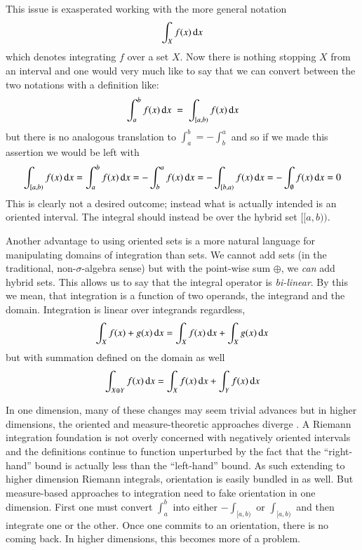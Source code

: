 This issue is exasperated working with the more general notation
\begin{equation*}
	\int_X f(x) \mathop{}\!\mathrm{d} x
\end{equation*}
which denotes integrating $f$ over a set $X$.
Now there is nothing stopping $X$ from an interval and one would very much like to say that we can convert between the
two notations with a definition like:
\begin{equation*}
	\int_a^b f(x) \mathop{}\!\mathrm{d} x \;=\; \int_{[a,b)} f(x) \mathop{}\!\mathrm{d} x
\end{equation*}
but there is no analogous translation to $\int_a^b = - \int_b^a$ and so if we made this assertion we would be left with
\begin{equation*}
	\int_{[a,b)} f(x) \mathop{}\!\mathrm{d} x 
		= \int_a^b f(x) \mathop{}\!\mathrm{d} x 
		= -\int_b^a f(x) \mathop{}\!\mathrm{d} x 
		= - \int_{[b,a)} f(x)\mathop{}\!\mathrm{d} x 
		= -\int_\emptyset f(x)\mathop{}\!\mathrm{d} x 	
		= 0
\end{equation*}
This is clearly not a desired outcome; instead what is actually intended is an oriented interval.
The integral should instead be over the hybrid set $[\![a,b)\!)$.



Another advantage to using oriented sets is a more natural language for manipulating domains of integration than sets.
We cannot add sets (in the traditional, non-$\sigma$-algebra sense) 
but with the point-wise sum $\oplus$, we \emph{can} add hybrid sets.
This allows us to say that the integral operator is \emph{bi-linear}.
By this we mean, that integration is a function of two operands, the integrand and the domain.
Integration is linear over integrands regardless,
\begin{equation*}
	\int_{X} f(x) + g(x) \mathop{}\!\mathrm{d} x = \int_X f(x) \mathop{}\!\mathrm{d} x + \int_X g(x) \mathop{}\!\mathrm{d} x
\end{equation*}
but with summation defined on the domain as well
\begin{equation*}
	\int_{X\oplus Y} f(x) \mathop{}\!\mathrm{d} x = \int_{X} f(x) \mathop{}\!\mathrm{d} x + \int_Y f(x) \mathop{}\!\mathrm{d} x
\end{equation*}


In one dimension, many of these changes may seem trivial advances but in higher dimensions, 
the oriented and measure-theoretic approaches diverge \cite{tao2007differential}.
A Riemann integration foundation is not overly concerned with negatively oriented intervals and the definitions continue
to function unperturbed by the fact that the ``right-hand'' bound is actually less than the ``left-hand'' bound.
As such extending to higher dimension Riemann integrals, orientation is easily bundled in as well.
But measure-based approaches to integration need to fake orientation in one dimension.
First one must convert $\int_a^b$ into either $-\int_{[a,b)}$ or $\int_{[a,b)}$ and then integrate one or the other.
Once one commits to an orientation, there is no coming back.
In higher dimensions, this becomes more of a problem.


